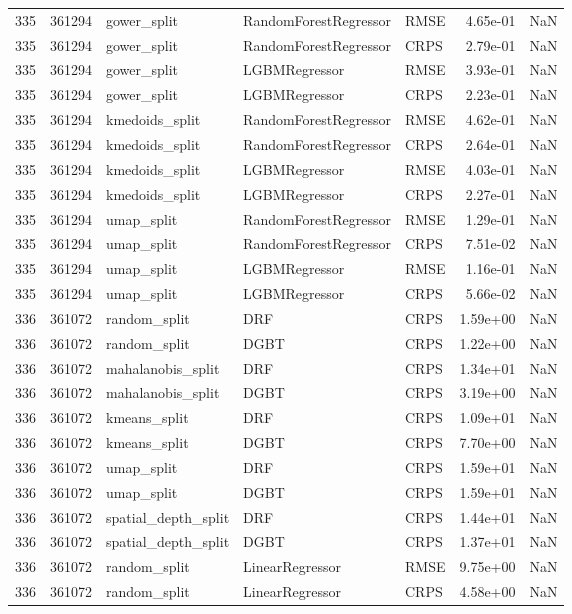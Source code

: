 \begin{tabular}{rrlllrr}
335 & 361294 & gower\_split & RandomForestRegressor & RMSE & 4.65e-01 & NaN \\
335 & 361294 & gower\_split & RandomForestRegressor & CRPS & 2.79e-01 & NaN \\
335 & 361294 & gower\_split & LGBMRegressor & RMSE & 3.93e-01 & NaN \\
335 & 361294 & gower\_split & LGBMRegressor & CRPS & 2.23e-01 & NaN \\
335 & 361294 & kmedoids\_split & RandomForestRegressor & RMSE & 4.62e-01 & NaN \\
335 & 361294 & kmedoids\_split & RandomForestRegressor & CRPS & 2.64e-01 & NaN \\
335 & 361294 & kmedoids\_split & LGBMRegressor & RMSE & 4.03e-01 & NaN \\
335 & 361294 & kmedoids\_split & LGBMRegressor & CRPS & 2.27e-01 & NaN \\
335 & 361294 & umap\_split & RandomForestRegressor & RMSE & 1.29e-01 & NaN \\
335 & 361294 & umap\_split & RandomForestRegressor & CRPS & 7.51e-02 & NaN \\
335 & 361294 & umap\_split & LGBMRegressor & RMSE & 1.16e-01 & NaN \\
335 & 361294 & umap\_split & LGBMRegressor & CRPS & 5.66e-02 & NaN \\
336 & 361072 & random\_split & DRF & CRPS & 1.59e+00 & NaN \\
336 & 361072 & random\_split & DGBT & CRPS & 1.22e+00 & NaN \\
336 & 361072 & mahalanobis\_split & DRF & CRPS & 1.34e+01 & NaN \\
336 & 361072 & mahalanobis\_split & DGBT & CRPS & 3.19e+00 & NaN \\
336 & 361072 & kmeans\_split & DRF & CRPS & 1.09e+01 & NaN \\
336 & 361072 & kmeans\_split & DGBT & CRPS & 7.70e+00 & NaN \\
336 & 361072 & umap\_split & DRF & CRPS & 1.59e+01 & NaN \\
336 & 361072 & umap\_split & DGBT & CRPS & 1.59e+01 & NaN \\
336 & 361072 & spatial\_depth\_split & DRF & CRPS & 1.44e+01 & NaN \\
336 & 361072 & spatial\_depth\_split & DGBT & CRPS & 1.37e+01 & NaN \\
336 & 361072 & random\_split & LinearRegressor & RMSE & 9.75e+00 & NaN \\
336 & 361072 & random\_split & LinearRegressor & CRPS & 4.58e+00 & NaN \\

\end{tabular}
